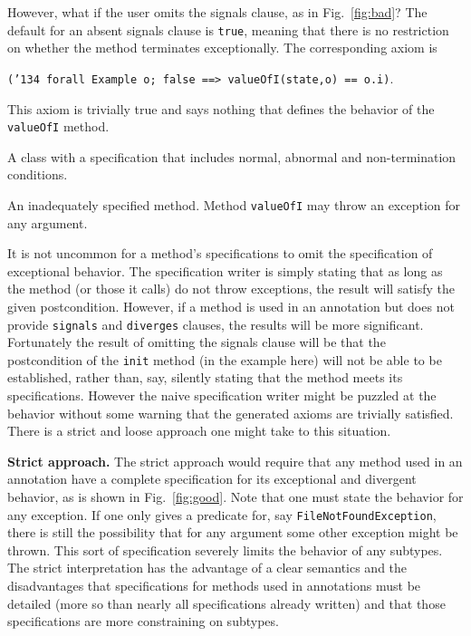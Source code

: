 \documentclass{sig-alternate}
\begin{document}
However, what if the user omits the signals clause, as in Fig.~\ref{fig:bad}?  The default for an
absent signals clause is \texttt{true}, meaning that there is no restriction on whether the method
terminates exceptionally.  The corresponding axiom is 
\begin{center}\texttt{(\char'134 forall Example o; false ==> valueOfI(state,o) == o.i)}.\end{center}
This axiom is trivially true and says nothing that defines the behavior of the \texttt{valueOfI}
method.   


\begin{BFIGURE}

\caption{A class with a specification that includes normal, abnormal and non-termination conditions.}
\label{fig:good}
\end{BFIGURE}

\begin{BFIGURE}

\caption{An inadequately specified method.  Method \texttt{valueOfI} may throw an 
exception for any argument.}
\label{fig:bad}
\end{BFIGURE}

It is not uncommon for a method's specifications to omit the specification of exceptional 
behavior.  The specification writer is simply stating that as long as the method (or those it calls)
do not throw exceptions, the result will satisfy the given postcondition.  However, if a method
is used in an annotation but does not provide \texttt{signals} and \texttt{diverges} clauses,
the results will be more significant.
Fortunately the result of omitting the signals clause will be that the postcondition of
the \texttt{init} method (in the example here) 
will not be able to be established, rather than, say, silently stating that the
method meets its specifications.  However the naive specification writer might be puzzled at
the behavior without some warning that the generated axioms are trivially satisfied.
There is a strict and loose approach one might take to this situation.

{\bf Strict approach.}  The strict approach would require that any method used in an annotation
have a complete specification for its exceptional and divergent behavior, as is shown
in Fig.~\ref{fig:good}.  Note that one must state the behavior for any exception.  If one only gives 
a predicate for, say \texttt{FileNotFoundException}, there is still the possibility that for any argument
some other exception might be thrown.  This sort of specification severely limits the behavior of 
any subtypes.   
The strict interpretation has the advantage of a clear semantics and the disadvantages that
specifications for methods used in annotations must be detailed (more so than nearly all specifications already written) and that
those specifications are more constraining on subtypes.  
\end{document}
